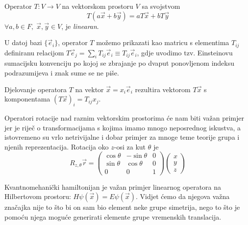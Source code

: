 \begin{definicija}
Operator $T:V \to V$ na vektorskom prostoru $V$
sa svojstvom
\begin{displaymath}
   T(a \vec{x} + b \vec{y} ) = a T\vec{x} + b T\vec{y} 
\end{displaymath}
 $\forall a,b\in F,\; \vec{x}, \vec{y} \in V$, je \emph{linearan}.
\end{definicija}

U datoj bazi $\{\vec{e}_{i}\}$, operator $T$ možemo prikazati
kao matricu s elementima $T_{ij}$ definiranu relacijom
$ T\vec{e}_j = \sum_{i} T_{ij} \vec{e}_i \equiv T_{ij} \vec{e}_i$, 
gdje uvodimo tzv. Einsteinovu sumacijsku konvenciju po kojoj se
zbrajanje po dvaput ponovljenom indeksu podrazumijeva i znak
sume se ne piše. 

Djelovanje operatora $T$ na vektor $\vec{x}=x_i \vec{e}_i$ rezultira
vektorom $T\vec{x}$  s komponentama $(T \vec{x})_i = T_{ij} x_j$.

\begin{primjer}
Operatori rotacije nad raznim vektorskim prostorima će nam biti važan primjer jer
je riječ o transformacijama s kojima imamo mnogo neposrednog iskustva,
a istovremeno su vrlo netrivijalne i dobar primjer za mnoge teme
teorije grupa i njenih reprezentacija.
Rotacija oko $z$-osi za kut $\theta$ je
\begin{equation*}
R_{z,\theta}\vec{r}=
\begin{pmatrix}
\cos\theta & -\sin\theta & 0 \\
\sin\theta & \cos\theta & 0 \\
 0 & 0 & 1
\end{pmatrix} 
\begin{pmatrix}
x \\ y \\ z
\end{pmatrix}
\end{equation*}
\end{primjer}

\begin{primjer}[Hamiltonijan]
Kvantnomehanički hamiltonijan je važan primjer linearnog operatora
na Hilbertovom prostoru: $H \psi(\vec{x}) = E \psi(\vec{x}) $.
Vidjet ćemo da njegova važna značajka nije to što bi on sam bio element neke
grupe simetrija, nego to što je pomoću njega moguće generirati
elemente grupe vremenskih translacija.
\end{primjer}

